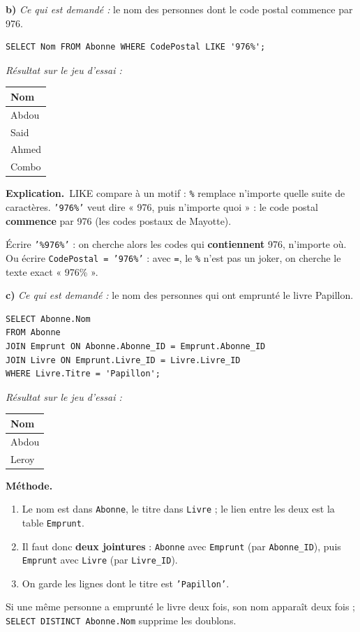 \documentclass[11pt, a4paper]{exam}
\newcommand{\code}[1]{\texttt{#1}}
\newcommand{\rappel}[1]{\noindent\textit{Ce qui est demandé :} #1\par\smallskip}
\newcommand{\methode}{\noindent\textbf{Méthode.}\ }
\newcommand{\explication}{\noindent\textbf{Explication.}\ }
\newcommand{\sql}[1]{\textsc{#1}}
\newcommand{\resultat}[1]{\par\smallskip\noindent\textit{Résultat sur le jeu d'essai :}\par\nopagebreak\begin{center}\footnotesize #1\end{center}}
\begin{document}
\textbf{b)} \rappel{le nom des personnes dont le code postal commence par 976.}
\begin{reponse}
\begin{lstlisting}[style=sqlc]
SELECT Nom FROM Abonne WHERE CodePostal LIKE '976%';
\end{lstlisting}
\end{reponse}
\resultat{\begin{tabular}{|l|}\hline Nom \\\hline Abdou \\ Said \\ Ahmed \\ Combo \\\hline\end{tabular}}
\explication \sql{LIKE} compare à un motif : \code{\%} remplace n'importe quelle suite de caractères. \code{'976\%'} veut dire « 976, puis n'importe quoi » : le code postal \textbf{commence} par 976 (les codes postaux de Mayotte).

\begin{erreur}
Écrire \code{'\%976\%'} : on cherche alors les codes qui \textbf{contiennent} 976, n'importe où. Ou écrire \code{CodePostal = '976\%'} : avec \code{=}, le \code{\%} n'est pas un joker, on cherche le texte exact « 976\% ».
\end{erreur}

\textbf{c)} \rappel{le nom des personnes qui ont emprunté le livre Papillon.}
\begin{reponse}
\begin{lstlisting}[style=sqlc]
SELECT Abonne.Nom
FROM Abonne
JOIN Emprunt ON Abonne.Abonne_ID = Emprunt.Abonne_ID
JOIN Livre ON Emprunt.Livre_ID = Livre.Livre_ID
WHERE Livre.Titre = 'Papillon';
\end{lstlisting}
\end{reponse}
\resultat{\begin{tabular}{|l|}\hline Nom \\\hline Abdou \\ Leroy \\\hline\end{tabular}}
\methode
\begin{enumerate}
\item Le nom est dans \code{Abonne}, le titre dans \code{Livre} ; le lien entre les deux est la table \code{Emprunt}.
\item Il faut donc \textbf{deux jointures} : \code{Abonne} avec \code{Emprunt} (par \code{Abonne\_ID}), puis \code{Emprunt} avec \code{Livre} (par \code{Livre\_ID}).
\item On garde les lignes dont le titre est \code{'Papillon'}.
\end{enumerate}
Si une même personne a emprunté le livre deux fois, son nom apparaît deux fois ; \code{SELECT DISTINCT Abonne.Nom} supprime les doublons.
\end{document}
